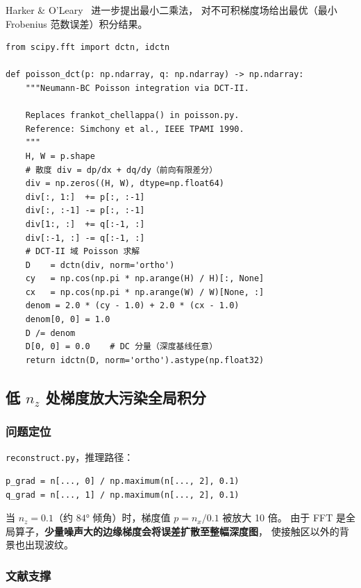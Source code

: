 \documentclass[12pt, a4paper]{ctexart}
\begin{document}
Harker \& O'Leary~\cite{harker2008least} 进一步提出最小二乘法，
对不可积梯度场给出最优（最小 Frobenius 范数误差）积分结果。

\begin{fixbox}[title={修复方案：基于 DCT-II 的 Poisson 求解器}]
\begin{lstlisting}
from scipy.fft import dctn, idctn

def poisson_dct(p: np.ndarray, q: np.ndarray) -> np.ndarray:
    """Neumann-BC Poisson integration via DCT-II.

    Replaces frankot_chellappa() in poisson.py.
    Reference: Simchony et al., IEEE TPAMI 1990.
    """
    H, W = p.shape
    # 散度 div = dp/dx + dq/dy（前向有限差分）
    div = np.zeros((H, W), dtype=np.float64)
    div[:, 1:]  += p[:, :-1]
    div[:, :-1] -= p[:, :-1]
    div[1:, :]  += q[:-1, :]
    div[:-1, :] -= q[:-1, :]
    # DCT-II 域 Poisson 求解
    D    = dctn(div, norm='ortho')
    cy   = np.cos(np.pi * np.arange(H) / H)[:, None]
    cx   = np.cos(np.pi * np.arange(W) / W)[None, :]
    denom = 2.0 * (cy - 1.0) + 2.0 * (cx - 1.0)
    denom[0, 0] = 1.0
    D /= denom
    D[0, 0] = 0.0    # DC 分量（深度基线任意）
    return idctn(D, norm='ortho').astype(np.float32)
\end{lstlisting}
\end{fixbox}

\subsection{低 $n_z$ 处梯度放大污染全局积分}
\label{subsec:nz_amplification}

\subsubsection*{问题定位}

\texttt{reconstruct.py}，推理路径：

\begin{lstlisting}[caption={nz=0.1 时梯度被放大 10 倍}]
p_grad = n[..., 0] / np.maximum(n[..., 2], 0.1)
q_grad = n[..., 1] / np.maximum(n[..., 2], 0.1)
\end{lstlisting}

当 $n_z = 0.1$（约 $84°$ 倾角）时，梯度值 $p = n_x/0.1$ 被放大 10 倍。
由于 FFT 是全局算子，\textbf{少量噪声大的边缘梯度会将误差扩散至整幅深度图}，
使接触区以外的背景也出现波纹。

\subsubsection*{文献支撑}
\end{document}

